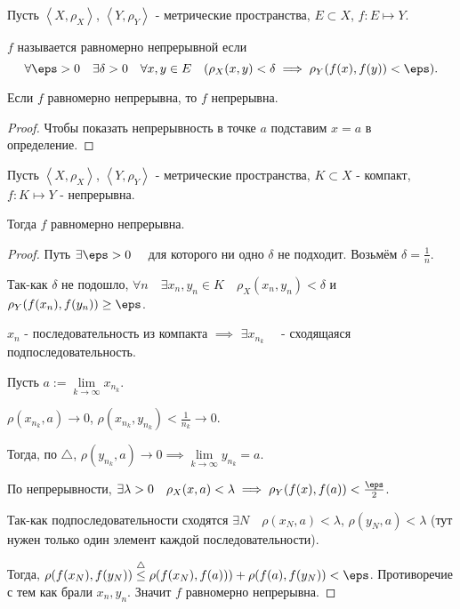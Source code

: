 
\begin{definition} \thmslashn 

    Пусть $\left<X, \rho_{X}\right>$, $\left<Y, \rho_{Y}\right>$ - метрические пространства, $E \subset X$, $f : E \mapsto Y$.

    $f$ называется равномерно непрерывной если
    \[ \forall{\eps > 0}\quad \exists{\delta > 0}\quad \forall{x, y\in E}\quad (\rho_{X}(x, y) < \delta \implies \rho_{Y}(f(x), f(y)) < \eps) .\] 
\end{definition}
\begin{lemma} \thmslashn

    Если $f$ равномерно непрерывна, то $f$ непрерывна.
    \begin{proof} \thmslashn
    
        Чтобы показать непрерывность в точке $a$ подставим $x=a$ в определение.
    \end{proof}
\end{lemma}
\begin{theorem}[Кантора] \thmslashn

    Пусть $\left<X, \rho_{X}\right>$, $\left<Y, \rho_{Y}\right>$ - метрические пространства, $K \subset X$ - компакт, $f : K \mapsto Y$ - непрерывна.
    

    Тогда $f$ равномерно непрерывна.
    \begin{proof} \thmslashn
    
        Путь $\exists{\eps > 0}\quad $ для которого ни одно $\delta$ не подходит. Возьмём $\delta = \frac{1}{n}$. 

        Так-как $\delta$ не подошло, $\forall{n}\quad \exists{x_{n}, y_{n}\in K}\quad \rho_{X}(x_{n}, y_{n}) < \delta$ и $\rho_{Y}(f(x_{n}), f(y_{n})) \ge  \eps$.

        $x_{n}$ - последовательность из компакта $\implies$ $\exists{x_{n_{k}}}\quad $ - сходящаяся подпоследовательность.

        Пусть $a := \lim\limits_{k \to \infty} x_{n_{k}}$.

        $\rho(x_{n_{k}}, a) \to 0$, $\rho(x_{n_{k}}, y_{n_{k}}) < \frac{1}{n_{k}} \to 0$.

        Тогда, по $\triangle$, $\rho(y_{n_{k}}, a) \to 0 \implies \lim\limits_{k \to \infty} y_{n_{k}} = a$.

        По непрерывности, $\exists{\lambda > 0}\quad \rho_{X}(x, a) < \lambda \implies \rho_{Y}(f(x), f(a)) < \frac{\eps}{2}$.

        Так-как подпоследовательности сходятся $\exists{N}\quad \rho(x_{N}, a) < \lambda$, $\rho(y_{N}, a) < \lambda$ (тут нужен только один элемент каждой последовательности).

        Тогда, $\rho(f(x_{N}), f(y_{N})) \overset{\triangle}{\le} \rho(f(x_{N}), f(a))) + \rho(f(a), f(y_{N})) < \eps$. Противоречие с тем как брали $x_{n}, y_{n}$. Значит $f$ равномерно непрерывна.
    \end{proof}
\end{theorem}
